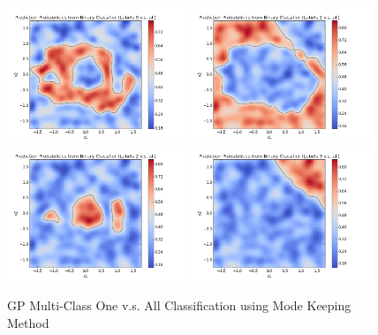 				\begin{figure}[!htbp]
					\centering
						\includegraphics[width=0.48\textwidth]{Figures/Progress/modekeepingOVA/Figure9.png}
						\includegraphics[width=0.48\textwidth]{Figures/Progress/modekeepingOVA/Figure10.png}
						\includegraphics[width=0.48\textwidth]{Figures/Progress/modekeepingOVA/Figure11.png}
						\includegraphics[width=0.48\textwidth]{Figures/Progress/modekeepingOVA/Figure12.png}
					\caption{GP Multi-Class One v.s. All Classification using Mode Keeping Method}
					\label{ProgressReport:GaussianProcessModels:Figure:modekeepingOVA3}
				\end{figure}
											
